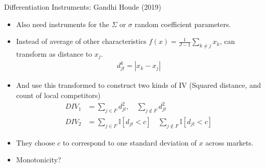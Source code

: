 

\begin{frame}{Differentiation Instruments: Gandhi Houde (2019)}
\begin{itemize}
\item Also need instruments for the $\Sigma$ or $\sigma$ random coefficient parameters.
\item Instead of average of other characteristics $f(x) = \frac{1}{J-1} \sum_{k \neq j} x_k$, can transform as distance to $x_j$.
\begin{align*}
d_{jt} ^k=  |x_k - x_j |
\end{align*}
\item And use this transformed to construct two kinds of IV (Squared distance, and count of local competitors)
\begin{align*}
DIV_1 &= \sum_{j \in F}  d_{jt}^2,  \quad  \sum_{j \notin F}  d_{jt}^2 \\
DIV_2 &= \sum_{j \in F}  \mathbb{I}[d_{jt} < c]   \quad \sum_{j \notin F}   \mathbb{I}[d_{jt} < c]
\end{align*}
\item They choose $c$ to correspond to one standard deviation of $x$ across markets.
\item Monotonicity?
\end{itemize}
\end{frame}


